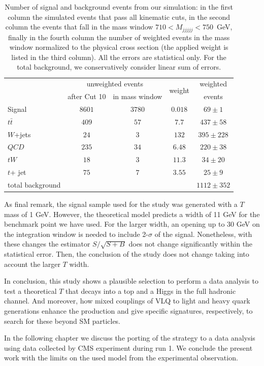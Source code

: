 \begin{table}[tb]
\begin{center}
\begin{tabular}{l|c|c|c|c}
 & \multicolumn{2}{c|}{unweighted events}  & \multirow{2}{*}{weight} & weighted  \\
 & after Cut 10 & in mass window & & events \\
 \hline
 Signal & $8601$ & $3780$ & $0.018$ &$69 \pm 1$ \\
 \hline
   $t \bar{t}$ & $409$ & $57$ & $7.7$ & $437 \pm 58$ \\
 $W$+jets & $24$ & $3$ & $132$ & $395 \pm 228$ \\
 $QCD$ & $235$ & $34$ & $6.48$ & $220 \pm 38$ \\
 $tW$ & $18$ & $3$ & $11.3$ & $34 \pm 20$ \\
 $t$+ jet & $75$ & $7$ & $3.55$ & $25 \pm 9$ \\
  \hline
  total background & & & & $1112 \pm 352$ \\
\end{tabular}
\caption{Number of signal and background events from our simulation: in the first column the simulated events that pass all kinematic cuts, in the second column the events that fall in the mass window $710 < M_{jjjjj} < 750$~GeV, finally in the fourth column the number of weighted events in the mass window normalized to the physical cross section (the applied weight is listed in the third column). All the errors are statistical only. For the total background, we conservatively consider linear sum of errors.} \label{tab:events} 
\end{center}
\end{table}

As final remark, the signal sample used for the study was generated with a $T$ mass of 1 GeV. However, the theoretical model predicts a width of 11 GeV for the benchmark point we have used. For the larger width, an opening up to 30 GeV on the integration window is needed to include 2-$\sigma$ of the signal. Nonetheless, with these changes the estimator $S/\sqrt{S+B}$ does not change significantly within the statistical error. Then, the conclusion of the study does not change taking into account the larger $T$ width.

In conclusion, this study shows a plausible selection to perform a data analysis to test a theoretical $T$ that decays into a top and a Higgs in the full hadronic channel. And moreover, how mixed couplings of VLQ to light and heavy quark generations enhance the production and give specific signatures, respectively, to search for these beyond SM particles. 

In the following chapter we discuss the porting of the strategy to a data analysis using data collected by CMS experiment during run 1. We conclude the present work with the limits on the used model from the experimental observation.

